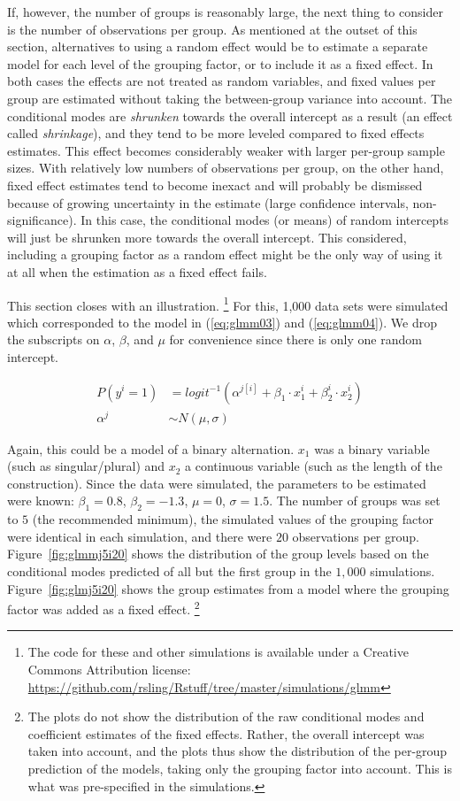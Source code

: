 \documentclass[a4paper,12pt]{article}
\begin{document}
If, however, the number of groups is reasonably large, the next thing to consider is the number of observations per group.
As mentioned at the outset of this section, alternatives to using a random effect would be to estimate a separate model for each level of the grouping factor, or to include it as a fixed effect.
In both cases the effects are not treated as random variables, and fixed values per group are estimated without taking the between-group variance into account.
The conditional modes are \textit{shrunken} towards the overall intercept as a result (an effect called \textit{shrinkage}), and they tend to be more leveled compared to fixed effects estimates.
This effect becomes considerably weaker with larger per-group sample sizes.
With relatively low numbers of observations per group, on the other hand, fixed effect estimates tend to become inexact and will probably be dismissed because of growing uncertainty in the estimate (large confidence intervals, non-significance).
In this case, the conditional modes (or means) of random intercepts will just be shrunken more towards the overall intercept.
This considered, including a grouping factor as a random effect might be the only way of using it at all when the estimation as a fixed effect fails.

This section closes with an illustration.%
\footnote{The code for these and other simulations is available under a Creative Commons Attribution license: \url{https://github.com/rsling/Rstuff/tree/master/simulations/glmm}}
For this, 1,000 data sets were simulated which corresponded to the model in (\ref{eq:glmm03}) and (\ref{eq:glmm04}).
We drop the subscripts on $\alpha$, $\beta$, and $\mu$ for convenience since there is only one random intercept.

\begin{align}
  P(y^i=1) & =logit^{-1}(\alpha^{j[i]}+\beta_1\cdot x_1^i+\beta_2^i\cdot x_2^i)
  \label{eq:glmm03}\\
  \alpha^j & \sim N(\mu, \sigma)\label{eq:glmm04}
\end{align}

Again, this could be a model of a binary alternation.
$x_1$ was a binary variable (such as singular\slash plural) and $x_2$ a continuous variable (such as the length of the construction).
Since the data were simulated, the parameters to be estimated were known: $\beta_1=0.8$, $\beta_2=-1.3$, $\mu=0$, $\sigma=1.5$.
The number of groups was set to $5$ (the recommended minimum), the simulated values of the grouping factor were identical in each simulation, and there were $20$ observations per group.
Figure~\ref{fig:glmmj5i20} shows the distribution of the group levels based on the conditional modes predicted of all but the first group in the $1,000$ simulations.
Figure~\ref{fig:glmj5i20} shows the group estimates from a model where the grouping factor was added as a fixed effect.%
\footnote{The plots do not show the distribution of the raw conditional modes and coefficient estimates of the fixed effects.
Rather, the overall intercept was taken into account, and the plots thus show the distribution of the per-group prediction of the models, taking only the grouping factor into account.
This is what was pre-specified in the simulations.}
\end{document}
